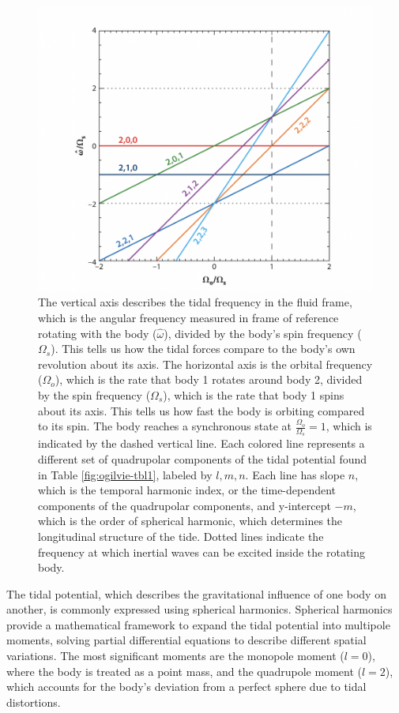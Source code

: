 \documentclass[oneside,12pt]{amsart}
\numberwithin{page}{section}
\begin{document}
\begin{figure}[htbp]
    \centering
    \includegraphics[width=0.8\linewidth]{figs/ogilvie_fig2.png}
    \caption{The vertical axis describes the tidal frequency in the fluid frame, which is the angular frequency measured in frame of reference rotating with the body ($\hat{\omega}$), divided by the body's spin frequency ($\Omega_s$). This tells us how the tidal forces compare to the body's own revolution about its axis. The horizontal axis is the orbital frequency ($\Omega_o$), which is the rate that body 1 rotates around body 2, divided by the spin frequency ($\Omega_s$), which is the rate that body 1 spins about its axis. This tells us how fast the body is orbiting compared to its spin. The body reaches a synchronous state at $\frac{\Omega_o}{\Omega_s} = 1$, which is indicated by the dashed vertical line. 
    Each colored line represents a different set of quadrupolar components of the tidal potential found in Table \ref{fig:ogilvie-tbl1}, labeled by $l, m, n$. Each line has slope $n$, which is the temporal harmonic index, or the time-dependent components of the quadrupolar components, and y-intercept $-m$, which is the order of spherical harmonic, which determines the longitudinal structure of the tide.
    Dotted lines indicate the frequency at which inertial waves can be excited inside the rotating body.}
    \label{fig:ogilvie-fig2}
\end{figure}

The tidal potential, which describes the gravitational influence of one body on another, is commonly expressed using spherical harmonics. Spherical harmonics provide a mathematical framework to expand the tidal potential into multipole moments, solving partial differential equations to describe different spatial variations. The most significant moments are the monopole moment ($l = 0$), where the body is treated as a point mass, and the quadrupole moment ($l=2$), which accounts for the body's deviation from a perfect sphere due to tidal distortions.
\end{document}
